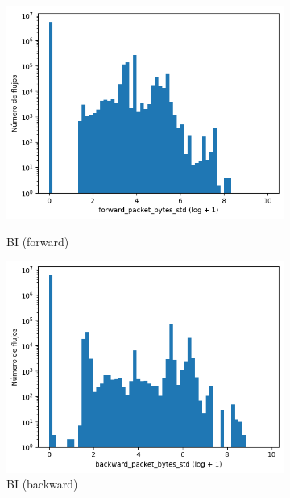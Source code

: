 \begin{figure}[H]
\begin{subfigure}[b]{0.26\textwidth}
        \includegraphics[width=\textwidth]{media/packet_pincer_botiot/forward_packet_bytes_std_log_x_log_y.png}
        \caption{BI (forward)}
        \includegraphics[width=\textwidth]{media/packet_pincer_botiot/backward_packet_bytes_std_log_x_log_y.png}
        \caption{BI (backward)}
    \end{subfigure}
    \hfill
    \begin{subfigure}[b]{0.26\textwidth}
        \centering

\end{subfigure}
\end{figure}
